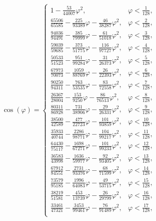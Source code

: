 \begin{equation*}
	\cos(\varphi)=
	\begin{cases}
		1 - \frac{53}{44007}\varphi^2, & \varphi < \frac{1}{128},\\
		\frac{65506}{65585} - \frac{225}{93389}\varphi - \frac{46}{38287}\varphi^2, & \varphi < \frac{2}{128},\\
		\frac{94036}{94491} - \frac{385}{79999}\varphi - \frac{61}{51018}\varphi^2, & \varphi < \frac{3}{128},\\
		\frac{59039}{59685} - \frac{373}{51775}\varphi - \frac{116}{97727}\varphi^2, & \varphi < \frac{4}{128},\\
		\frac{50533}{51523} - \frac{951}{99284}\varphi - \frac{31}{26373}\varphi^2, & \varphi < \frac{5}{128},\\
		\frac{67973}{70073} - \frac{1059}{88769}\varphi - \frac{26}{22393}\varphi^2, & \varphi < \frac{6}{128},\\
		\frac{90250}{94311} - \frac{763}{53535}\varphi - \frac{83}{72558}\varphi^2, & \varphi < \frac{7}{128},\\
		\frac{26367}{28004} - \frac{153}{9250}\varphi - \frac{86}{76513}\varphi^2, & \varphi < \frac{8}{128},\\
		\frac{80311}{86928} - \frac{731}{38906}\varphi - \frac{29}{26331}\varphi^2, & \varphi < \frac{9}{128},\\
		\frac{38500}{42589} - \frac{477}{22723}\varphi - \frac{101}{93859}\varphi^2, & \varphi < \frac{10}{128},\\
		\frac{35933}{40744} - \frac{2286}{98771}\varphi - \frac{104}{99217}\varphi^2, & \varphi < \frac{11}{128},\\
		\frac{64430}{75117} - \frac{1698}{67271}\varphi - \frac{101}{99233}\varphi^2, & \varphi < \frac{12}{128},\\
		\frac{36583}{43998} - \frac{1636}{59977}\varphi - \frac{92}{93405}\varphi^2, & \varphi < \frac{13}{128},\\
		\frac{67912}{84551} - \frac{2731}{93376}\varphi - \frac{68}{71599}\varphi^2, & \varphi < \frac{14}{128},\\
		\frac{73579}{95185} - \frac{1996}{64083}\varphi - \frac{49}{53715}\varphi^2, & \varphi < \frac{15}{128},\\
		\frac{38219}{51581} - \frac{453}{13739}\varphi - \frac{26}{29799}\varphi^2, & \varphi < \frac{16}{128},\\
		\frac{33461}{47321} - \frac{3453}{99461}\varphi - \frac{76}{91489}\varphi^2, & \varphi < \frac{17}{128},\\

\end{cases}
\end{equation*}
